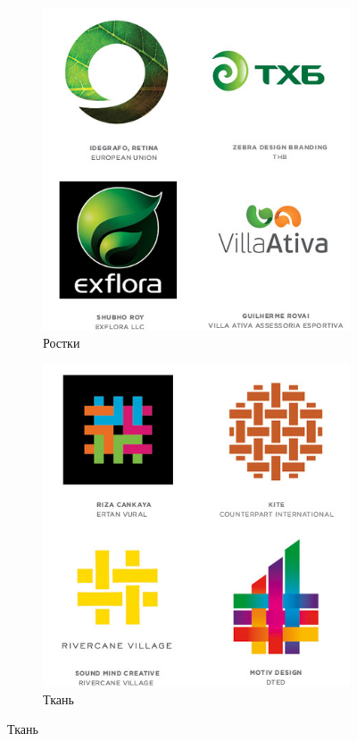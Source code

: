 \begin{figure}[h!]
  \vfill

  \centering
  \begin{subfigure}{.45\textwidth}
    \centering
    \includegraphics[width=\linewidth]{images/supplement/logolounge/2012/Rostki}
    \caption{Ростки}
    \label{fig:logolounge:2012:rostki}
  \end{subfigure}
  \hfill
  \centering
  \begin{subfigure}{.45\textwidth}
    \centering
    \includegraphics[width=\linewidth]{images/supplement/logolounge/2012/tkan'}
    \caption{Ткань}
    \label{fig:logolounge:2012:tkan'}
  \end{subfigure}
\end{figure}

